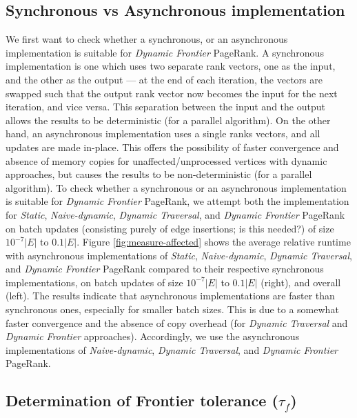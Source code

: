 \subsection{Synchronous vs Asynchronous implementation}

We first want to check whether a synchronous, or an asynchronous implementation is suitable for \textit{Dynamic Frontier} PageRank. 
A synchronous implementation is one which uses two separate rank vectors, one as the input, and the other as the output --- at the end of each iteration, the vectors are swapped such that the output rank vector now becomes the input for the next iteration, and vice versa. This separation between the input and the output allows the results to be deterministic (for a parallel algorithm). On the other hand, an asynchronous implementation uses a single ranks vectors, and all updates are made in-place. This offers the possibility of faster convergence and absence of memory copies for unaffected/unprocessed vertices with dynamic approaches, but causes the results to be non-deterministic (for a parallel algorithm). To check whether a synchronous or an asynchronous implementation is suitable for \textit{Dynamic Frontier} PageRank, we attempt both the implementation for \textit{Static}, \textit{Naive-dynamic}, \textit{Dynamic Traversal}, and \textit{Dynamic Frontier} PageRank on batch updates (consisting purely of edge insertions; is this needed?) of size $10^{-7}|E|$ to $0.1|E|$. Figure \ref{fig:measure-affected} shows the average relative runtime with asynchronous implementations of \textit{Static}, \textit{Naive-dynamic}, \textit{Dynamic Traversal}, and \textit{Dynamic Frontier} PageRank compared to their respective synchronous implementations, on batch updates of size $10^{-7}|E|$ to $0.1|E|$ (right), and overall (left). The results indicate that asynchronous implementations are faster than synchronous ones, especially for smaller batch sizes. This is due to a somewhat faster convergence and the absence of copy overhead (for \textit{Dynamic Traversal} and \textit{Dynamic Frontier} approaches). Accordingly, we use the asynchronous implementations of \textit{Naive-dynamic}, \textit{Dynamic Traversal}, and \textit{Dynamic Frontier} PageRank.




\subsection{Determination of Frontier tolerance ($\tau_f$)}

